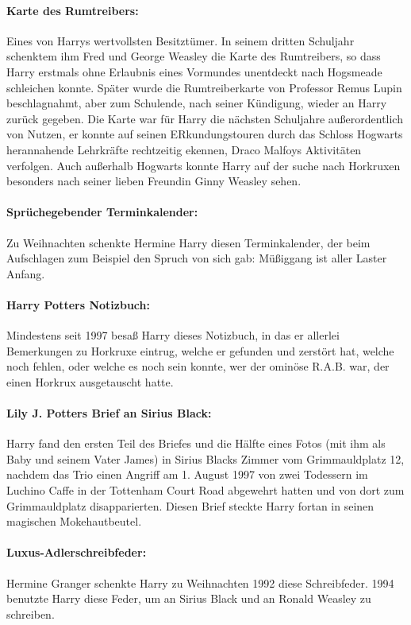 \documentclass[a4paper, 10pt]{article}
\begin{document}
\paragraph{Karte des Rumtreibers:}
Eines von Harrys wertvollsten Besitztümer. In seinem dritten Schuljahr schenktem ihm Fred und George Weasley die Karte des Rumtreibers, so dass Harry erstmals ohne Erlaubnis eines Vormundes unentdeckt nach Hogsmeade schleichen konnte. Später wurde die Rumtreiberkarte von Professor Remus Lupin beschlagnahmt, aber zum Schulende, nach seiner Kündigung, wieder an Harry zurück gegeben. Die Karte war für Harry die nächsten Schuljahre außerordentlich von Nutzen, er konnte auf seinen ERkundungstouren durch das Schloss Hogwarts herannahende Lehrkräfte rechtzeitig ekennen, Draco Malfoys Aktivitäten verfolgen. Auch außerhalb Hogwarts konnte Harry auf der suche nach Horkruxen besonders nach seiner lieben Freundin Ginny Weasley sehen.
\paragraph{Sprüchegebender Terminkalender:}
Zu Weihnachten schenkte Hermine Harry diesen Terminkalender, der beim Aufschlagen zum Beispiel den Spruch von sich gab: Müßiggang ist aller Laster Anfang.
\paragraph{Harry Potters Notizbuch:}
Mindestens seit 1997 besaß Harry dieses Notizbuch, in das er allerlei Bemerkungen zu Horkruxe eintrug, welche er gefunden und zerstört hat, welche noch fehlen, oder welche es noch sein konnte, wer der ominöse R.A.B. war, der einen Horkrux ausgetauscht hatte.
\paragraph{Lily J. Potters Brief an Sirius Black:}
Harry fand den ersten Teil des Briefes und die Hälfte eines Fotos (mit ihm als Baby und seinem Vater James) in Sirius Blacks Zimmer vom Grimmauldplatz 12, nachdem das Trio einen Angriff am 1. August 1997 von zwei Todessern im Luchino Caffe in der Tottenham Court Road abgewehrt hatten und von dort zum Grimmauldplatz disapparierten. Diesen Brief steckte Harry fortan in seinen magischen Mokehautbeutel.
\paragraph{Luxus-Adlerschreibfeder:}
Hermine Granger schenkte Harry zu Weihnachten 1992 diese Schreibfeder. 1994 benutzte Harry diese Feder, um an Sirius Black und an Ronald Weasley zu schreiben.
\end{document}
